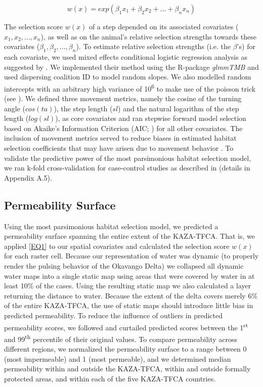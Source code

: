 \documentclass[abstract=on,10pt,a4paper,bibliography=totocnumbered]{article}
\begin{document}
\begin{equation}
\label{EQ1}
  w(x) = exp(\beta_1 x_1 + \beta_2 x_2 + ... + \beta_n x_n)
\end{equation}

\noindent The selection score \(w(x)\) of a step depended on its associated
covariates (\(x_1, x_2, ..., x_n\)), as well as on the animal's relative
selection strengths  towards these covariates
(\(\beta_1, \beta_2, ..., \beta_n\)). To estimate relative selection strengths
 (i.e. the \(\beta\)'s) for each covariate, we used
mixed effects conditional logistic regression analysis as suggested by
\cite{Muff.2020}. We implemented their method using the R-package
\textit{glmmTMB} \citep{Mollie.2017} and used dispersing coalition ID to model
random slopes. We also modelled random intercepts with an arbitrary high
variance of 10\textsuperscript{6} to make use of the poisson trick (see
\citealp{Muff.2020}). We defined three movement metrics, namely the cosine of
the turning angle (\(cos(ta)\)), the step length (\(sl\)) and the natural
logarithm of the step length (\(log(sl)\)), as core covariates and ran stepwise
forward model selection based on Akaike's Information Criterion (AIC;
\citealp{Burnham.2002}) for all other covariates.
The inclusion of movement metrics served to reduce biases in estimated habitat
selection coefficients  that may have arisen due to
movement behavior \citep{Avgar.2016}. To validate the predictive power of the
most parsimonious habitat selection model, we ran k-fold cross-validation for
case-control studies as described in \cite{Fortin.2009} (details in Appendix
A.5).

\subsection{Permeability Surface}
Using the most parsimonious habitat selection model, we predicted a permeability
surface spanning the entire extent of the KAZA-TFCA. That is, we applied
\ref{EQ1} to our spatial covariates and calculated the selection score \(w(x)\)
for each raster cell. Because our representation of water was dynamic (to
properly render the pulsing behavior of the Okavango Delta) we collapsed all
dynamic water maps into a single static map using areas that were covered by
water in at least 10\% of the cases. Using the resulting static map we also
calculated a layer returning the distance to water. Because the extent of the
delta covers merely 6\% of the entire KAZA-TFCA, the use of static maps should
introduce little bias in predicted permeability. To reduce the influence of
outliers in predicted permeability scores, we followed \cite{Squires.2013} and
curtailed predicted scores between the 1\textsuperscript{st} and
99\textsuperscript{th} percentile of their original values. To compare
permeability across different regions, we normalized the permeability surface to
a range between 0 (most impermeable) and 1 (most permeable), and we determined
median permeability within and outside the KAZA-TFCA, within and outside
formally protected areas, and within each of the five KAZA-TFCA countries.
\end{document}
